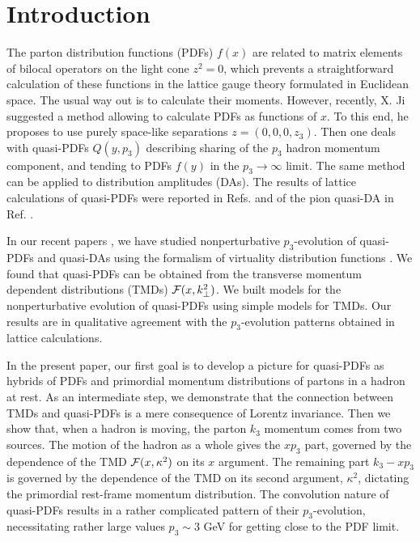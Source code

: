 \section{Introduction}

The parton distribution functions (PDFs) $f(x)$ \cite{Feynman:1973xc}
are related to matrix elements
of bilocal operators on the light cone $z^2=0$, which prevents
a straightforward calculation of these functions in the lattice
gauge theory
formulated in Euclidean space.
The usual way out is to calculate their moments.
However, recently, X. Ji \cite{Ji:2013dva} suggested a method
allowing to calculate PDFs as functions of $x$.
To this end, he proposes to use purely space-like
separations $z=(0,0,0,z_3)$.
Then one deals with quasi-PDFs $Q(y,p_3)$ describing sharing
of the $p_3$ hadron momentum component,
and
tending to PDFs $f(y)$
in the \mbox{$p_3 \to \infty$} limit.
The same method can be applied to distribution amplitudes (DAs).
The results of lattice calculations of
quasi-PDFs were reported
in Refs. \cite{Lin:2014zya,Chen:2016utp,Alexandrou:2015rja}
and of the pion quasi-DA in Ref. \cite{Zhang:2017bzy}.

In our recent papers \cite{Radyushkin:2016hsy,Radyushkin:2017gjd},
we have studied nonperturbative $p_3$-evolution of
quasi-PDFs and quasi-DAs
using the formalism of virtuality distribution functions
\cite{Radyushkin:2014vla,Radyushkin:2015gpa}.
We found that quasi-PDFs can be obtained from
the transverse momentum dependent
distributions (TMDs) ${\cal F} (x, k_\perp^2)$. We
built models for the nonperturbative evolution of
quasi-PDFs using simple models for TMDs.
Our results are in qualitative agreement with the
\mbox{$p_3$-evolution} patterns obtained in lattice calculations.

In the present paper, our first goal
is to develop a picture for
quasi-PDFs as hybrids of PDFs and
primordial
momentum distributions of partons in a hadron at rest.
As an intermediate step, we demonstrate that the connection between
TMDs and quasi-PDFs
\cite{Radyushkin:2016hsy} is a mere consequence
of Lorentz invariance. Then we show that,
when a hadron is moving, the parton $k_3$ momentum
comes from two sources. The motion
of the hadron as a whole gives
the $xp_3$ part, governed by the dependence of
the TMD ${\cal F} (x, \kappa^2)$ on its $x$ argument.
The remaining part $k_3-xp_3$
is governed by the dependence of the TMD on its second argument,
$\kappa^2$,
dictating the primordial
rest-frame
momentum distribution. The convolution nature of quasi-PDFs
results in a rather complicated pattern of their
\mbox{$p_3$-evolution,} necessitating rather large values $p_3 \sim 3$ GeV
for getting close to the PDF limit.

